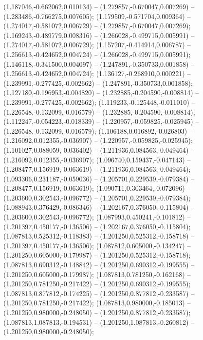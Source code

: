  (1.187046,-0.662062,0.010134) -- (1.279857,-0.670047,0.007269) -- (1.283486,-0.766275,0.007605);
 (1.179509,-0.571704,0.009364) -- (1.274017,-0.581072,0.006729) -- (1.279857,-0.670047,0.007269);
 (1.169243,-0.489779,0.008316) -- (1.266028,-0.499715,0.005991) -- (1.274017,-0.581072,0.006729);
 (1.157207,-0.414914,0.006787) -- (1.256613,-0.424652,0.004724) -- (1.266028,-0.499715,0.005991);
 (1.146118,-0.341500,0.004097) -- (1.247891,-0.350733,0.001858) -- (1.256613,-0.424652,0.004724);
 (1.136127,-0.268910,0.000221) -- (1.239991,-0.277425,-0.002662) -- (1.247891,-0.350733,0.001858);
 (1.127180,-0.196953,-0.004820) -- (1.232885,-0.204590,-0.008814) -- (1.239991,-0.277425,-0.002662);
 (1.119233,-0.125448,-0.011010) -- (1.226548,-0.132099,-0.016579) -- (1.232885,-0.204590,-0.008814);
 (1.112247,-0.054223,-0.018339) -- (1.220957,-0.059825,-0.025945) -- (1.226548,-0.132099,-0.016579);
 (1.106188,0.016892,-0.026803) -- (1.216092,0.012355,-0.036907) -- (1.220957,-0.059825,-0.025945);
 (1.101027,0.088059,-0.036402) -- (1.211936,0.084563,-0.049464) -- (1.216092,0.012355,-0.036907);
 (1.096740,0.159437,-0.047143) -- (1.208477,0.156919,-0.063619) -- (1.211936,0.084563,-0.049464);
 (1.093306,0.231187,-0.059036) -- (1.205701,0.229539,-0.079384) -- (1.208477,0.156919,-0.063619);
 (1.090711,0.303464,-0.072096) -- (1.203600,0.302543,-0.096772) -- (1.205701,0.229539,-0.079384);
 (1.088943,0.376429,-0.086346) -- (1.202167,0.376050,-0.115804) -- (1.203600,0.302543,-0.096772);
 (1.087993,0.450241,-0.101812) -- (1.201397,0.450177,-0.136506) -- (1.202167,0.376050,-0.115804);
 (1.087813,0.525312,-0.118383) -- (1.201250,0.525312,-0.158718) -- (1.201397,0.450177,-0.136506);
 (1.087812,0.605000,-0.134247) -- (1.201250,0.605000,-0.179987) -- (1.201250,0.525312,-0.158718);
 (1.087813,0.690312,-0.148842) -- (1.201250,0.690312,-0.199555) -- (1.201250,0.605000,-0.179987);
 (1.087813,0.781250,-0.162168) -- (1.201250,0.781250,-0.217422) -- (1.201250,0.690312,-0.199555);
 (1.087813,0.877812,-0.174225) -- (1.201250,0.877812,-0.233587) -- (1.201250,0.781250,-0.217422);
 (1.087813,0.980000,-0.185013) -- (1.201250,0.980000,-0.248050) -- (1.201250,0.877812,-0.233587);
 (1.087813,1.087813,-0.194531) -- (1.201250,1.087813,-0.260812) -- (1.201250,0.980000,-0.248050);

